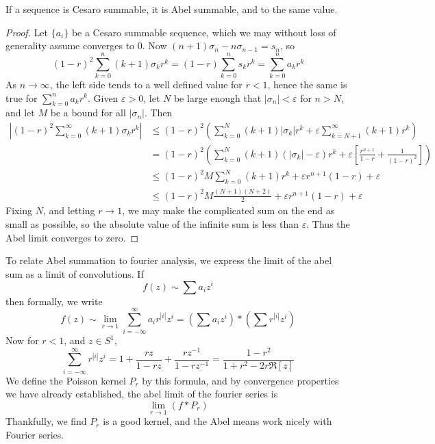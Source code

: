 \begin{theorem}
    If a sequence is Cesaro summable, it is Abel summable, and to the same value.
\end{theorem}
\begin{proof}
    Let $\{ a_i \}$ be a Cesaro summable sequence, which we may without loss of generality assume converges to $0$. Now $(n + 1)\sigma_n - n \sigma_{n-1} = s_n$, so
    \[ (1 - r)^2 \sum_{k = 0}^n (k + 1) \sigma_k r^k = (1 - r) \sum_{k = 0}^n s_k r^k = \sum_{k = 0}^n a_k r^k \]
    As $n \to \infty$, the left side tends to a well defined value for $r < 1$, hence the same is true for $\sum_{k = 0}^n a_k r^k$. Given $\varepsilon > 0$, let $N$ be large enough that $|\sigma_n| < \varepsilon$ for $n > N$, and let $M$ be a bound for all $|\sigma_n|$. Then
    \begin{align*}
        \left| (1 - r)^2 \sum_{k = 0}^\infty (k + 1) \sigma_k r^k \right| &\leq (1 - r)^2 \left( \sum_{k = 0}^N (k + 1) |\sigma_k| r^k + \varepsilon \sum_{k = N+1}^\infty (k + 1) r^k \right)\\
        &= (1 - r)^2 \left( \sum_{k = 0}^N (k + 1) (|\sigma_k| - \varepsilon) r^k + \varepsilon \left[ \frac{r^{n+1}}{1-r} + \frac{1}{(1 - r)^2} \right] \right)\\
        &\leq (1 - r)^2 M \sum_{k = 0}^N (k + 1) r^k + \varepsilon r^{n+1} (1 - r) + \varepsilon\\
        &\leq (1 - r)^2 M \frac{(N+1)(N+2)}{2} + \varepsilon r^{n+1} (1 - r) + \varepsilon
    \end{align*}
    Fixing $N$, and letting $r \to 1$, we may make the complicated sum on the end as small as possible, so the absolute value of the infinite sum is less than $\varepsilon$. Thus the Abel limit converges to zero.
\end{proof}

To relate Abel summation to fourier analysis, we express the limit of the abel sum as a limit of convolutions. If
%
\[ f(z) \sim \sum a_i z^i \]
%
then formally, we write
%
\[ f(z) \sim \lim_{r \to 1} \sum_{i = -\infty}^\infty a_i r^{|i|} z^i = \left( \sum a_i z^i \right) * \left( \sum r^{|i|} z^i \right) \]
%
Now for $r < 1$, and $z \in S^1$,
%
\[ \sum_{i = -\infty}^\infty r^{|i|} z^i = 1 + \frac{rz}{1 - rz} + \frac{rz^{-1}}{1 - rz^{-1}} = \frac{1 - r^2}{1 + r^2 - 2r \Re[z]} \]
%
We define the Poisson kernel $P_r$ by this formula, and by convergence properties we have already established, the abel limit of the fourier series is
%
\[ \lim_{r \to 1} (f * P_r) \]
%
Thankfully, we find $P_r$ is a good kernel, and the Abel means work nicely with Fourier series.




